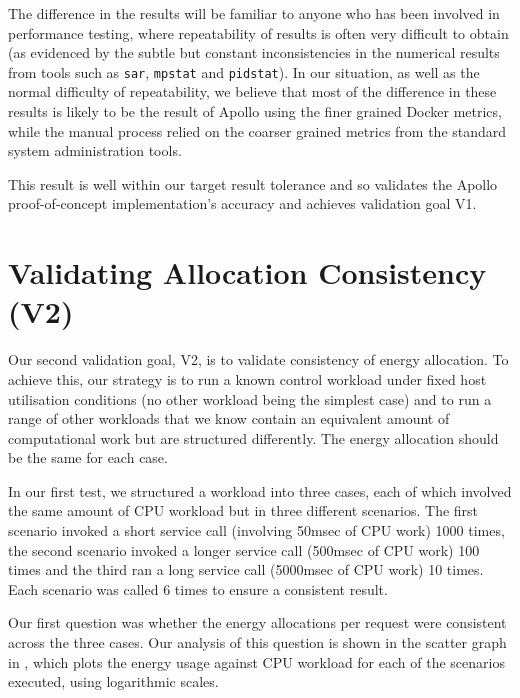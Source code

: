 The difference in the results will be familiar to anyone who has been involved in performance testing, where repeatability of results is often very difficult to obtain (as evidenced by the subtle but constant inconsistencies in the numerical results from tools such as \texttt{sar}, \texttt{mpstat} and \texttt{pidstat}).  In our situation, as well as the normal difficulty of repeatability, we believe that most of the difference in these results is likely to be the result of Apollo using the finer grained Docker metrics, while the manual process relied on the coarser grained metrics from the standard system administration tools. 

This result is well within our target result tolerance and so validates the Apollo proof-of-concept implementation's accuracy and achieves validation goal V1.

\section{Validating Allocation Consistency (V2)}
\label{section:validatingconsistency}

Our second validation goal, V2, is to validate consistency of energy allocation.  To achieve this, our strategy is to run a known control workload under fixed host utilisation conditions (no other workload being the simplest case) and to run a range of other workloads that we know contain an equivalent amount of computational work but are structured differently.  The energy allocation should be the same for each case.

In our first test, we structured a workload into three cases, each of which involved the same amount of CPU workload but in three different scenarios.  The first scenario invoked a short service call (involving 50msec of CPU work) 1000 times, the second scenario invoked a longer service call (500msec of CPU work) 100 times and the third ran a long service call (5000msec of CPU work) 10 times.  Each scenario was called 6 times to ensure a consistent result.

Our first question was whether the energy allocations per request were consistent across the three cases.  Our analysis of this question is shown in the scatter graph in , which plots the energy usage against CPU workload for each of the scenarios executed, using logarithmic scales.

